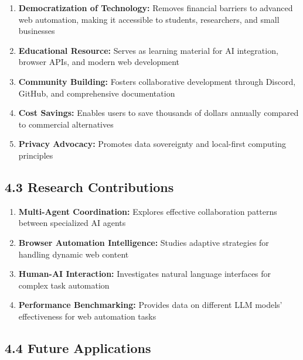 \documentclass[12pt,a4paper]{article}
\begin{document}
\begin{enumerate}
    \item \textbf{Democratization of Technology:} Removes financial barriers to advanced web automation, making it accessible to students, researchers, and small businesses
    
    \item \textbf{Educational Resource:} Serves as learning material for AI integration, browser APIs, and modern web development
    
    \item \textbf{Community Building:} Fosters collaborative development through Discord, GitHub, and comprehensive documentation
    
    \item \textbf{Cost Savings:} Enables users to save thousands of dollars annually compared to commercial alternatives
    
    \item \textbf{Privacy Advocacy:} Promotes data sovereignty and local-first computing principles
\end{enumerate}

\subsection*{\textbf{4.3 Research Contributions}}

\begin{enumerate}
    \item \textbf{Multi-Agent Coordination:} Explores effective collaboration patterns between specialized AI agents
    
    \item \textbf{Browser Automation Intelligence:} Studies adaptive strategies for handling dynamic web content
    
    \item \textbf{Human-AI Interaction:} Investigates natural language interfaces for complex task automation
    
    \item \textbf{Performance Benchmarking:} Provides data on different LLM models' effectiveness for web automation tasks
\end{enumerate}

\subsection*{\textbf{4.4 Future Applications}}
\end{document}
